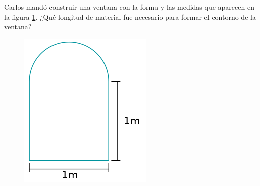 Carlos mandó construir una ventana con la forma y las medidas que aparecen en
la figura \ref{fig:ventana}. ¿Qué longitud de material fue necesario para formar el contorno de la ventana?

\begin{figure}[H]
    \centering
    \includegraphics[width=.5\linewidth]{../images/ventana2}
    \label{fig:ventana}
\end{figure}